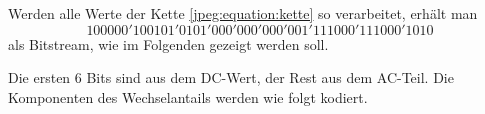 \begin{beispiel}
Werden alle Werte der Kette \eqref{jpeg:equation:kette} so verarbeitet,
erhält man
\begin{equation}
    100000'100101'0101'000'000'000'001'111000'111000'1010
    \label{jpeg:equation:bitstream}    
\end{equation}
als Bitstream, wie im Folgenden gezeigt werden soll.

Die ersten 6 Bits sind aus dem DC-Wert, der Rest aus dem AC-Teil.
Die Komponenten des Wechselantails werden wie folgt kodiert.





\end{beispiel}
